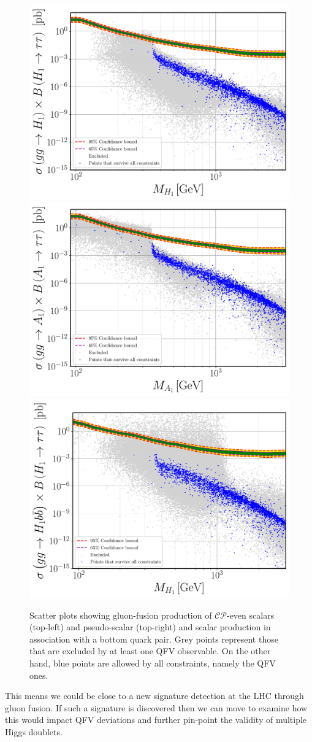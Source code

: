 \documentclass[10pt]{report}
\begin{document}
%
\begin{figure}[htb!]
	\centering
	\includegraphics[width=.49\textwidth]{Images/3HDM/Xsec/Xsec_1_Grey_tight.pdf}	\includegraphics[width=.49\textwidth]{Images/3HDM/Xsec/Xsec_2_Colourful_tight.pdf}
	\includegraphics[width=.49\textwidth]{Images/3HDM/Xsec/Xsec_3_Grey_Thight.pdf}
	\caption{Scatter plots showing gluon-fusion production of $\mathcal{CP}$-even scalars (top-left) and pseudo-scalar (top-right) and scalar production in association with a bottom quark pair. Grey points represent those that are excluded by at least one QFV observable. On the other hand, blue points are allowed by all constraints, namely the QFV ones.}
	\label{Generic_3HDM_Result_Label}
\end{figure}	
%
%
This means we could be close to a new signature detection at the LHC through gluon fusion. If such a signature is discovered then we can move to examine how this would impact QFV deviations and further pin-point the validity of multiple Higgs doublets.  
\end{document}
